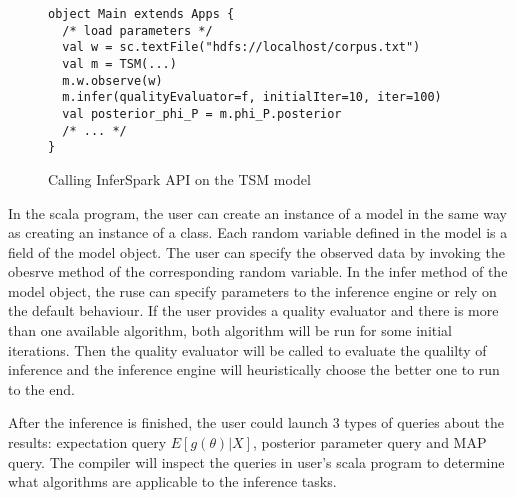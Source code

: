 \begin{figure}[!h]
\begin{verbatim}
object Main extends Apps {
  /* load parameters */
  val w = sc.textFile("hdfs://localhost/corpus.txt")
  val m = TSM(...)
  m.w.observe(w)
  m.infer(qualityEvaluator=f, initialIter=10, iter=100)
  val posterior_phi_P = m.phi_P.posterior
  /* ... */
}
\end{verbatim}
\caption{Calling InferSpark API on the TSM model}
\label{fig:TSM_API}
\end{figure}

In the scala program, the user can create an instance of a model in the
same way as creating an instance of a class. Each random variable defined in
the model is a field of the model object. The user can specify the observed data by
invoking the obesrve method of the corresponding random variable. In the infer
method of the model object, the ruse can specify parameters to the inference
engine or rely on the default behaviour. If the user provides a
quality evaluator and there is more than one available algorithm, both
algorithm will be run for some initial iterations. Then the quality evaluator
will be called to evaluate the qualilty of inference and the inference engine
will heuristically choose the better one to run to the end.

After the inference is finished, the user could launch 3 types of
queries about the results: expectation query $E[g(\theta)|X]$, posterior
parameter query and MAP query. The compiler will inspect the queries in user's
scala program to determine what algorithms are applicable to the inference
tasks.



